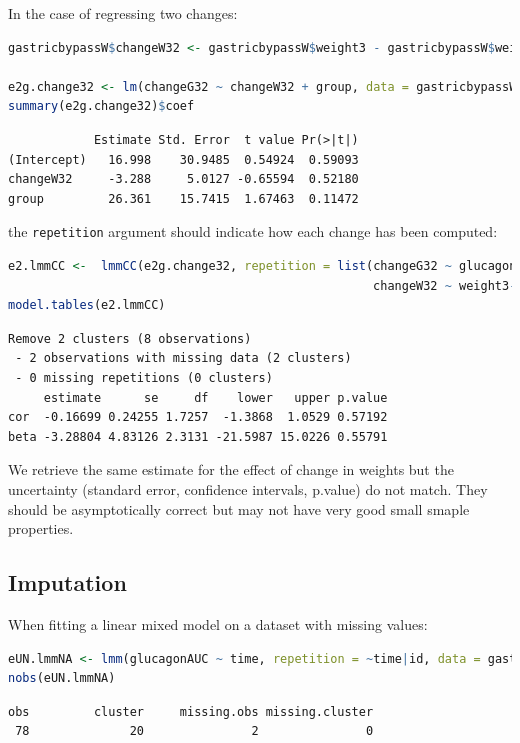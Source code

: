 \documentclass[12pt]{article}
\begin{document}
In the case of regressing two changes:
\begin{lstlisting}[language=r,numbers=none]
gastricbypassW$changeW32 <- gastricbypassW$weight3 - gastricbypassW$weight2

e2g.change32 <- lm(changeG32 ~ changeW32 + group, data = gastricbypassW)
summary(e2g.change32)$coef
\end{lstlisting}

\label{}
\begin{verbatim}
            Estimate Std. Error  t value Pr(>|t|)
(Intercept)   16.998    30.9485  0.54924  0.59093
changeW32     -3.288     5.0127 -0.65594  0.52180
group         26.361    15.7415  1.67463  0.11472
\end{verbatim}


the \texttt{repetition} argument should indicate how each change has
been computed:
\begin{lstlisting}[language=r,numbers=none]
e2.lmmCC <-  lmmCC(e2g.change32, repetition = list(changeG32 ~ glucagonAUC3-glucagonAUC2|id,
                                                   changeW32 ~ weight3-weight2|id))
model.tables(e2.lmmCC)
\end{lstlisting}

\label{}
\begin{verbatim}
Remove 2 clusters (8 observations) 
 - 2 observations with missing data (2 clusters) 
 - 0 missing repetitions (0 clusters)
     estimate      se     df    lower   upper p.value
cor  -0.16699 0.24255 1.7257  -1.3868  1.0529 0.57192
beta -3.28804 4.83126 2.3131 -21.5987 15.0226 0.55791
\end{verbatim}


We retrieve the same estimate for the effect of change in weights but
the uncertainty (standard error, confidence intervals, p.value) do not
match. They should be asymptotically correct but may not have very
good small smaple properties.
\subsection{Imputation}
\label{imputation}
When fitting a linear mixed model on a dataset with missing values:
\begin{lstlisting}[language=r,numbers=none]
eUN.lmmNA <- lmm(glucagonAUC ~ time, repetition = ~time|id, data = gastricbypassL)
nobs(eUN.lmmNA)
\end{lstlisting}

\label{}
\begin{verbatim}
obs         cluster     missing.obs missing.cluster 
 78              20               2               0
\end{verbatim}
\end{document}
